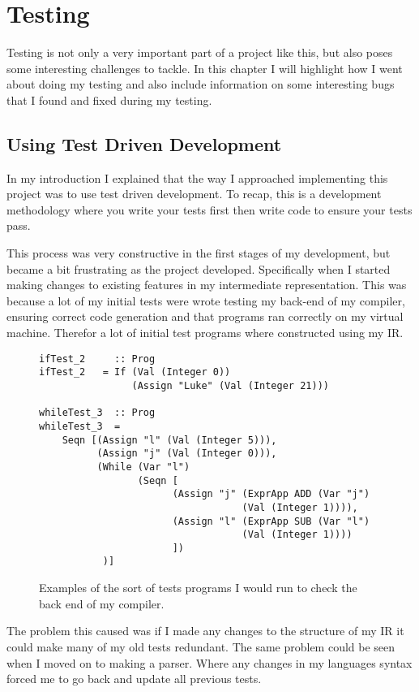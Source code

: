 
\chapter{Testing}

Testing is not only a very important part of a project like this, but also poses some interesting challenges to tackle. In this chapter I will highlight how I went about doing my testing and also include information on some interesting bugs that I found and fixed during my testing.

\section{Using Test Driven Development}

In my introduction I explained that the way I approached implementing this project was to use test driven development. To recap, this is a development methodology where you write your tests first then write code to ensure your tests pass.

This process was very constructive in the first stages of my development, but became a bit frustrating as the project developed. Specifically when I started making changes to existing features in my intermediate representation. This was because a lot of my initial tests were wrote testing my back-end of my compiler, ensuring correct code generation and that programs ran correctly on my virtual machine. Therefor a lot of initial test programs where constructed using my IR. 


\begin{figure}[h]
\centering
\begin{lstlisting}
ifTest_2     :: Prog     
ifTest_2   = If (Val (Integer 0)) 
                (Assign "Luke" (Val (Integer 21)))

whileTest_3  :: Prog      
whileTest_3  = 
    Seqn [(Assign "l" (Val (Integer 5))), 
          (Assign "j" (Val (Integer 0))), 
          (While (Var "l") 
                 (Seqn [
                       (Assign "j" (ExprApp ADD (Var "j") 
                                   (Val (Integer 1)))),
                       (Assign "l" (ExprApp SUB (Var "l") 
                                   (Val (Integer 1))))
                       ])
           )]
\end{lstlisting}
\caption{Examples of the sort of tests programs I would run to check the back end of my compiler.}
\label{fig:egEarlyTests} 
\end{figure}  

The problem this caused was if I made any changes to the structure of my IR it could make many of my old tests redundant. The same problem could be seen when I moved on to making a parser. Where any changes in my languages syntax forced me to go back and update all previous tests.

